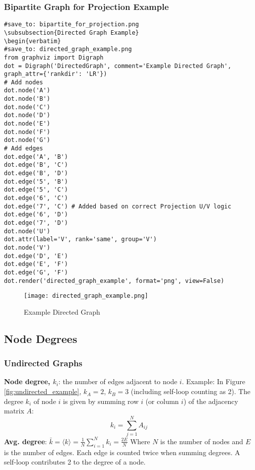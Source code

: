 \documentclass{article}
\begin{document}
\subsubsection{Bipartite Graph for Projection Example}
\begin{verbatim}
#save_to: bipartite_for_projection.png
\subsubsection{Directed Graph Example}
\begin{verbatim}
#save_to: directed_graph_example.png
from graphviz import Digraph
dot = Digraph('DirectedGraph', comment='Example Directed Graph', graph_attr={'rankdir': 'LR'})
# Add nodes
dot.node('A')
dot.node('B')
dot.node('C')
dot.node('D')
dot.node('E')
dot.node('F')
dot.node('G')
# Add edges
dot.edge('A', 'B')
dot.edge('B', 'C')
dot.edge('B', 'D')
dot.edge('5', 'B')
dot.edge('5', 'C')
dot.edge('6', 'C')
dot.edge('7', 'C') # Added based on correct Projection U/V logic
dot.edge('6', 'D')
dot.edge('7', 'D')
dot.node('U')
dot.attr(label='V', rank='same', group='V')
dot.node('V')
dot.edge('D', 'E')
dot.edge('E', 'F')
dot.edge('G', 'F')
dot.render('directed_graph_example', format='png', view=False)
\end{verbatim}
\begin{figure}[h]
\centering
\texttt{[image: directed\_graph\_example.png]}
\caption{Example Directed Graph}
\label{fig:directed_example}
\end{figure}
\subsection{Node Degrees}
\subsubsection{Undirected Graphs}
\textbf{Node degree, $k_i$}: the number of edges adjacent to node $i$.
Example: In Figure \ref{fig:undirected_example}, $k_A = 2$, $k_B = 3$ (including self-loop counting as 2).
The degree $k_i$ of node $i$ is given by summing row $i$ (or column $i$) of the adjacency matrix $A$:
\[ k_i = \sum_{j=1}^N A_{ij} \]
\textbf{Avg. degree}: $\bar{k} = \langle k \rangle = \frac{1}{N} \sum_{i=1}^N k_i = \frac{2E}{N}$
Where $N$ is the number of nodes and $E$ is the number of edges. Each edge is counted twice when summing degrees. A self-loop contributes 2 to the degree of a node.
\end{document}

